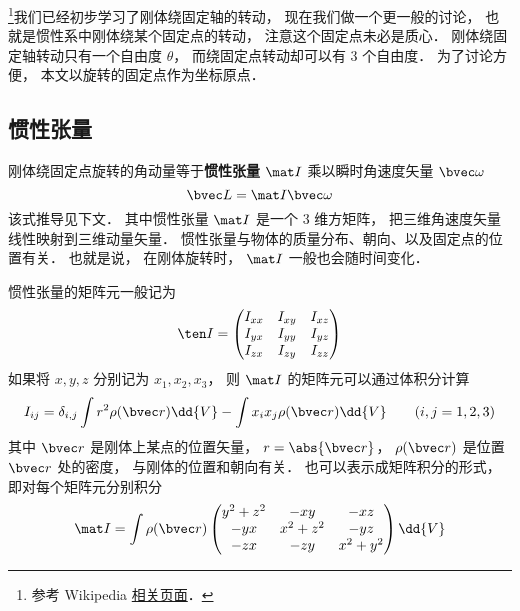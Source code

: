 
\begin{issues}
\issueTODO
\end{issues}


\footnote{参考 Wikipedia \href{https://en.wikipedia.org/wiki/Moment_of_inertia}{相关页面}．}我们已经初步学习了刚体绕固定轴的转动， 现在我们做一个更一般的讨论， 也就是惯性系中刚体绕某个固定点的转动， 注意这个固定点未必是质心． 刚体绕固定轴转动只有一个自由度 $\theta$， 而绕固定点转动却可以有 3 个自由度． 为了讨论方便， 本文以旋转的固定点作为坐标原点．

\subsection{惯性张量}
刚体绕固定点旋转的角动量等于\textbf{惯性张量} $\mat I$ 乘以瞬时角速度矢量 $\bvec \omega$
\begin{equation}\label{ITensr_eq3}
\bvec L = \mat I \bvec \omega
\end{equation}
该式推导见下文． 其中惯性张量 $\mat I$ 是一个 3 维方矩阵， 把三维角速度矢量线性映射到三维动量矢量． 惯性张量与物体的质量分布、朝向、以及固定点的位置有关． 也就是说， 在刚体旋转时， $\mat I$ 一般也会随时间变化．

惯性张量的矩阵元一般记为
\begin{equation}
\ten I = \begin{pmatrix}
I_{xx}& I_{xy}& I_{xz} \\
I_{yx}& I_{yy}& I_{yz} \\
I_{zx}& I_{zy}& I_{zz}
\end{pmatrix}
\end{equation}
如果将 $x, y, z$ 分别记为 $x_1, x_2, x_3$， 则 $\mat I$ 的矩阵元可以通过体积分计算
\begin{equation}\label{ITensr_eq1}
I_{ij} = \delta_{i, j} \int r^2 \rho(\bvec r)\dd{V} - \int x_i x_j \rho(\bvec r)\dd{V} \qquad (i, j = 1, 2, 3)
\end{equation}
其中 $\bvec r$ 是刚体上某点的位置矢量， $r = \abs{\bvec r}$， $\rho(\bvec r)$ 是位置 $\bvec r$ 处的密度， 与刚体的位置和朝向有关． 也可以表示成矩阵积分的形式， 即对每个矩阵元分别积分
\begin{equation}\label{ITensr_eq2}
\mat I = \int \rho(\bvec r)
\begin{pmatrix}
y^2 + z^2 & -xy & -xz\\
-yx & x^2 + z^2 & -yz\\
-zx & -zy & x^2 + y^2
\end{pmatrix}
\dd{V}
\end{equation}

